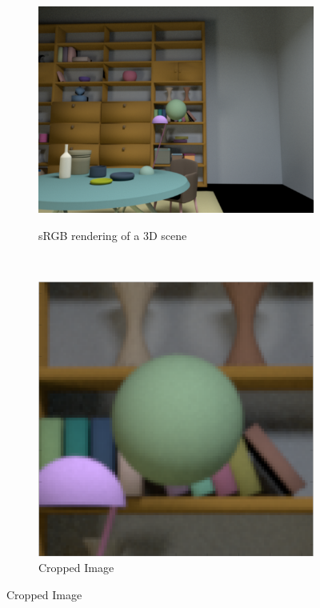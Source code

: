 \documentclass{jov}
\begin{document}
\begin{figure}
\centering
\begin{subfigure}[b]{0.25 \textwidth}
		\centering
        \caption{sRGB rendering of a 3D scene}
        \includegraphics[width=\textwidth]{../Figures/Figure8/Figure8_a.png}
        \label{fig:3DScene}
    \end{subfigure}
    ~ 
    \begin{subfigure}[b]{0.19 \textwidth}   
    \hspace{0.1 \textwidth}
        \caption{Cropped Image}
        \vspace{1.5mm}
        \includegraphics[width=\textwidth]{../Figures/Figure8/Figure8_b.png}

\end{subfigure}
\end{figure}
\end{document}
